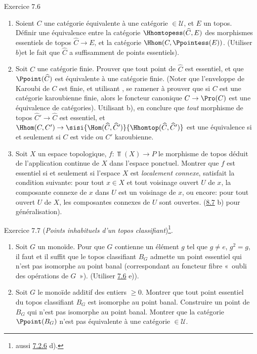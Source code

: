 \documentclass[10pt]{../fichiers-configuration-latex/smfart}
\begin{document}
\begin{enonce*}[remark]{Exercice 7.6}
\begin{enumerate}
\item Soient $C$ une catégorie équivalente à une catégorie $\in
𝒰$, et $E$ un topos. Définir une équivalence entre la
catégorie $\Hhomtopess(\widehat{C},E)$ des morphismes essentiels de
topos $\widehat{C}\rightarrow E$, et la catégorie $\Hhom(C,
\Ppointess(E))$. (Utiliser $b$)\pageoriginale et le fait que
$\widehat{C}$ a suffisamment de points essentiels).

\item Soit $C$ une catégorie finie. Prouver que tout point de
$\widehat{C}$ est essentiel, et que $\Ppoint(\widehat{C})$ est
équivalente à une catégorie finie. (Noter que l'enveloppe de Karoubi
de $C$ est finie, et utilisant , se ramener à prouver
que si $C$ est une catégorie karoubienne finie, alors le foncteur
canonique $C\rightarrow \Pro(C)$ est une équivalence de catégories).
Utilisant b), en conclure que \emph{tout} morphisme de topos
$\widehat{C}'\rightarrow \widehat{C}$ est essentiel, et
$\Hhom(C,C')\rightarrow \sisi{\Hom(\widehat{C},\widehat{C}')}{\Hhomtop(\widehat{C},\widehat{C}')}$ est une
équivalence si et seulement si $C$ est vide ou $C'$ karoubienne.

\item Soit $X$ un espace topologique, $f:\Top(X)\rightarrow P$ le
morphisme de topos déduit de l'application continue de $X$ dans
l'espace ponctuel. Montrer que $f$ est essentiel si et seulement si
l'espace $X$ est \emph{localement connexe}, \ie satisfait la
condition suivante: pour tout $x\in X$ et tout voisinage ouvert $U$
de $x$, la composante connexe de $x$ dans $U$ est un voisinage de
$x$, ou encore: pour tout ouvert $U$ de $X$, les composantes
connexes de $U$ sont ouvertes. (\cf \hyperref[IV.exer8.7]{8.7} b) pour
généralisation).
\end{enumerate}
\end{enonce*}

\begin{enonce*}[remark]{Exercice 7.7}
(\emph{Points inhabituels d'un topos classifiant})\footnote[1]{\cf
aussi \hyperref[IV.exer7.2.6]{7.2.6} d).}.
\begin{enumerate}
\renewcommand{\theenumi}{\alph{enumi}}
\renewcommand{\labelenumi}{\theenumi)}
\item Soit $G$ un monoïde. Pour que $G$ contienne un élément $g$ tel
que $g\neq e$, $g^2=g$, il faut et il suffit que le topos
classifiant $B_G$ admette un point essentiel qui n'est pas isomorphe
au point banal (correspondant au foncteur fibre « oubli des
opérations de $G$ »). (Utiliser \hyperref[IV.exer7.6]{7.6} e)).

\item Soit $G$ le monoïde additif des entiers $\geq 0$. Montrer que
tout point essentiel du topos classifiant $B_G$ est isomorphe au
point banal. Construire un point de $B_G$ qui n'est pas isomorphe au
point banal. Montrer que la catégorie $\Ppoint(B_G)$ n'est pas
équivalente à une catégorie $\in 𝒰$.
\end{enumerate}
\end{enonce*}
\end{document}
